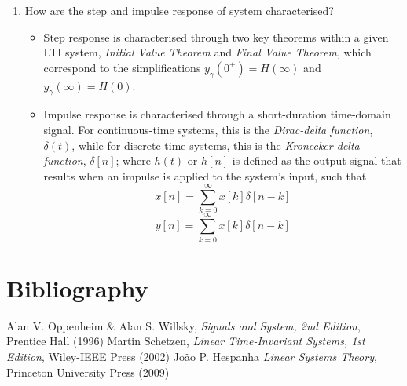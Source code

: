 \documentclass[12pt]{article}
\begin{document}
\begin{enumerate}
\item How are the step and impulse response of system characterised?
\begin{itemize}
\item Step response is characterised through two key theorems within a given LTI system, \emph{Initial Value Theorem} and \emph{Final Value Theorem}, which correspond to the simplifications $y_\gamma(0^+)=H(\infty)$ and $y_\gamma(\infty)=H(0)$.
\item Impulse response is characterised through a short-duration time-domain signal. For continuous-time systems, this is the \emph{Dirac-delta function}, $\delta(t)$, while for discrete-time systems, this is the \emph{Kronecker-delta function}, $\delta[n]$; where $h(t)$ or $h[n]$ is defined as the output signal that results when an impulse is applied to the system's input, such that
$$x[n]=\sum^{\infty}_{k=0}x[k]\delta[n-k]$$
$$y[n]=\sum^{\infty}_{k=0}x[k]\delta[n-k]$$
\end{itemize}
\end{enumerate}

\section{Bibliography}
\begin{thebibliography}{3}
  Alan V. Oppenheim \& Alan S. Willsky,
  \emph{Signals and System, 2nd Edition},
  Prentice Hall (1996)
  Martin Schetzen,
  \emph{Linear Time-Invariant Systems, 1st Edition},
  Wiley-IEEE Press (2002)
  João P. Hespanha
  \emph{Linear Systems Theory},
  Princeton University Press (2009)
\end{thebibliography}
\end{document}
